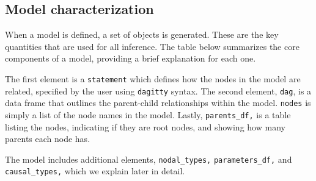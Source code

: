\documentclass[
  11pt,
  article]{jss}
\begin{document}
\hypertarget{model-characterization}{%
\subsection{Model characterization}\label{model-characterization}}

When a model is defined, a set of objects is generated. These are the
key quantities that are used for all inference. The table below
summarizes the core components of a model, providing a brief explanation
for each one.

The first element is a \texttt{statement} which defines how the nodes in
the model are related, specified by the user using \texttt{dagitty}
syntax. The second element, \texttt{dag}, is a data frame that outlines
the parent-child relationships within the model. \texttt{nodes} is
simply a list of the node names in the model. Lastly,
\texttt{parents\_df,} is a table listing the nodes, indicating if they
are root nodes, and showing how many parents each node has.

The model includes additional elements, \texttt{nodal\_types,}
\texttt{parameters\_df,} and \texttt{causal\_types,} which we explain
later in detail.
\end{document}
